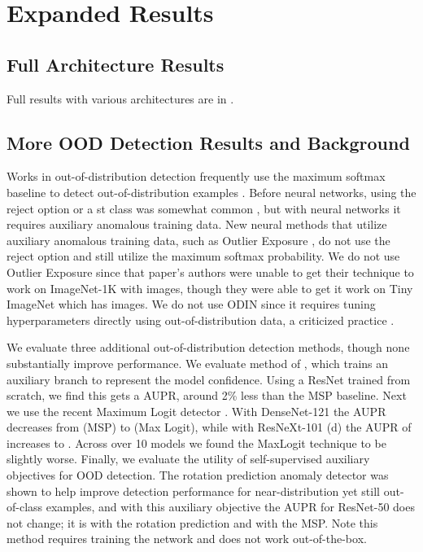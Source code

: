 \documentclass[10pt,twocolumn,letterpaper]{article}
\begin{document}
\section{Expanded Results}


\subsection{Full Architecture Results}
Full results with various architectures are in .

\subsection{More OOD Detection Results and Background}

Works in out-of-distribution detection frequently use the maximum softmax baseline to detect out-of-distribution examples \cite{hendrycks17baseline}. Before neural networks, using the reject option or a st class was somewhat common \cite{Bartlett2008ClassificationWA}, but with neural networks it requires auxiliary anomalous training data. New neural methods that utilize auxiliary anomalous training data, such as Outlier Exposure \cite{hendrycks2019oe}, do not use the reject option and still utilize the maximum softmax probability. We do not use Outlier Exposure since that paper's authors were unable to get their technique to work on ImageNet-1K with  images, though they were able to get it work on Tiny ImageNet which has  images. We do not use ODIN since it requires tuning hyperparameters directly using out-of-distribution data, a criticized practice \cite{hendrycks2019oe}.





We evaluate three additional out-of-distribution detection methods, though none substantially improve performance. We evaluate method of \cite{Devries2018LearningCF}, which trains an auxiliary branch to represent the model confidence. Using a ResNet trained from scratch, we find this gets a  AUPR, around 2\% less than the MSP baseline. Next we use the recent Maximum Logit detector \cite{Hendrycks2020ScalingOD}. With 
DenseNet-121 the AUPR decreases from  (MSP) to  (Max Logit), while with ResNeXt-101 (d) the AUPR of  increases to . Across over 10 models we found the MaxLogit technique to be slightly worse. Finally, we evaluate the utility of self-supervised auxiliary objectives for OOD detection. The rotation prediction anomaly detector \cite{Hendrycks2019UsingSL} was shown to help improve detection performance for near-distribution yet still out-of-class examples, and with this auxiliary objective the AUPR for ResNet-50 does not change; it is  with the rotation prediction and  with the MSP. Note this method requires training the network and does not work out-of-the-box. 
\end{document}
